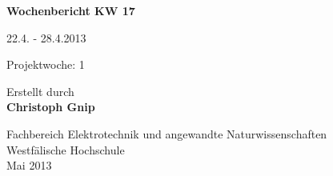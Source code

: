 
\begin{center}
{\Huge \textbf{Wochenbericht KW 17}\par}
\vspace{1cm}
{\Huge 22.4. - 28.4.2013\par}
\vspace{1cm}
{\Huge Projektwoche: 1\par}

\vspace{2cm}

\large{Erstellt durch}\\
\Large{\textbf{Christoph Gnip}}


\vfill

{\normalsize Fachbereich Elektrotechnik und angewandte Naturwissenschaften\\
Westfälische Hochschule\\[2ex]Mai 2013}


\end{center}
\newpage